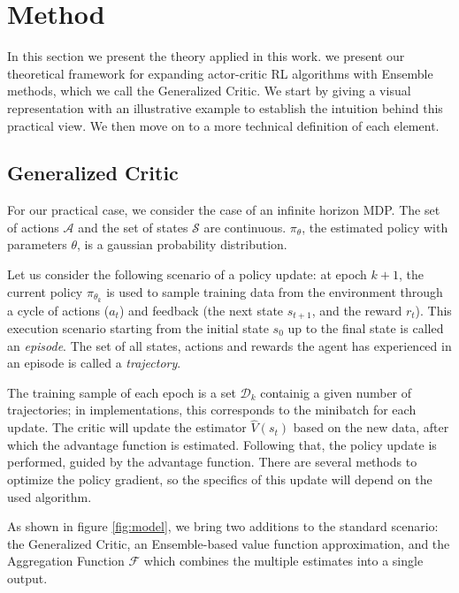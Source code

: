 \section{Method}
\label{sec:method}

In this section we present the theory applied in this work. 
we present our theoretical framework for expanding actor-critic RL algorithms with Ensemble methods, which we call the Generalized Critic. We start by giving a visual representation with an illustrative example to establish the intuition behind this practical view. We then move on to a more technical definition of each element.

\subsection{Generalized Critic}

For our practical case, we consider the case of an infinite horizon MDP. The set of actions $\mathcal{A}$ and the set of states $\mathcal{S}$ are continuous. $\pi_\theta$, the estimated policy with parameters $\theta$, is a gaussian probability distribution.

Let us consider the following scenario of a policy update: 
at epoch $k+1$, the current policy $\pi_{\theta_k}$ is used to sample training data from the environment through a cycle of actions ($a_t$) and feedback (the next state $s_{t+1}$, and the reward $r_t$). This execution scenario starting from the initial state $s_0$ up to the final state is called an \emph{episode}. The set of all states, actions and rewards the agent has experienced in an episode is called a \emph{trajectory}. 

The training sample of each epoch is a set $\mathcal{D}_k$ containig a given number of trajectories; in implementations, this corresponds to the minibatch for each update. The critic will update the estimator $\hat{V}(s_t)$ based on the new data, after which the advantage function is estimated. Following that, the policy update is performed, guided by the advantage function. There are several methods to optimize the policy gradient, so the specifics of this update will depend on the used algorithm.

As shown in figure \ref{fig:model}, we bring two additions to the standard scenario: the Generalized Critic, an Ensemble-based value function approximation, and the Aggregation Function $\mathcal{F}$ which combines the multiple estimates into a single output.



